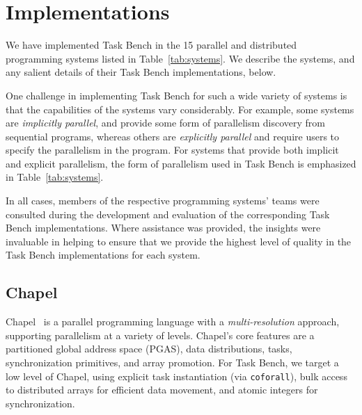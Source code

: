 \section{Implementations}
\label{sec:implementation}

We have implemented Task Bench in the 15 parallel and distributed
programming systems listed in Table~\ref{tab:systems}. We describe the
systems, and any salient details of their Task Bench implementations,
below.

One challenge in implementing Task Bench for such a wide variety of
systems is that the capabilities of the systems vary considerably. For
example, some systems are \emph{implicitly parallel}, and provide some
form of parallelism discovery from sequential programs, whereas others
are \emph{explicitly parallel} and require users to specify the
parallelism in the program. For systems that provide both implicit and explicit parallelism, the form of parallelism used in Task Bench is emphasized in Table~\ref{tab:systems}.



In all cases, members of the respective programming systems' teams
were consulted during the development and evaluation of the
corresponding Task Bench implementations. Where assistance was provided, the insights were invaluable
in helping to ensure that we provide the highest level of quality in the Task
Bench implementations for each system.



\subsection{Chapel}

Chapel~\cite{Chapel15} is a parallel programming language
with a \emph{multi-res\-o\-lu\-tion} approach, supporting parallelism at a variety of
levels. Chapel's core features are a partitioned global address space
(PGAS), data distributions, tasks,
synchronization primitives, and array promotion. For Task Bench, we target a low level of
Chapel, using explicit task instantiation (via
\lstinline[language=Chapel]{coforall}), bulk access to distributed
arrays for efficient data movement, and atomic integers for
synchronization.

